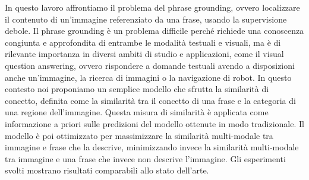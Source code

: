 
In questo lavoro affrontiamo il problema del phrase grounding, ovvero
localizzare il contenuto di un'immagine referenziato da una frase,
usando la supervisione debole. Il phrase grounding è un problema
difficile perché richiede una conoscenza congiunta e approfondita di
entrambe le modalità testuali e visuali, ma è di rilevante importanza
in diversi ambiti di studio e applicazioni, come il visual question
answering, ovvero rispondere a domande testuali avendo a disposizioni
anche un'immagine, la ricerca di immagini o la navigazione di robot.
In questo contesto noi proponiamo un semplice modello che sfrutta la
similarità di concetto, definita come la similarità tra il concetto di
una frase e la categoria di una regione dell'immagine. Questa misura
di similarità è applicata come informazione a priori sulle predizioni
del modello ottenute in modo tradizionale. Il modello è poi
ottimizzato per massimizzare la similarità multi-modale tra immagine e
frase che la descrive, minimizzando invece la similarità multi-modale
tra immagine e una frase che invece non descrive l'immagine. Gli
esperimenti svolti mostrano risultati comparabili allo stato
dell'arte.
